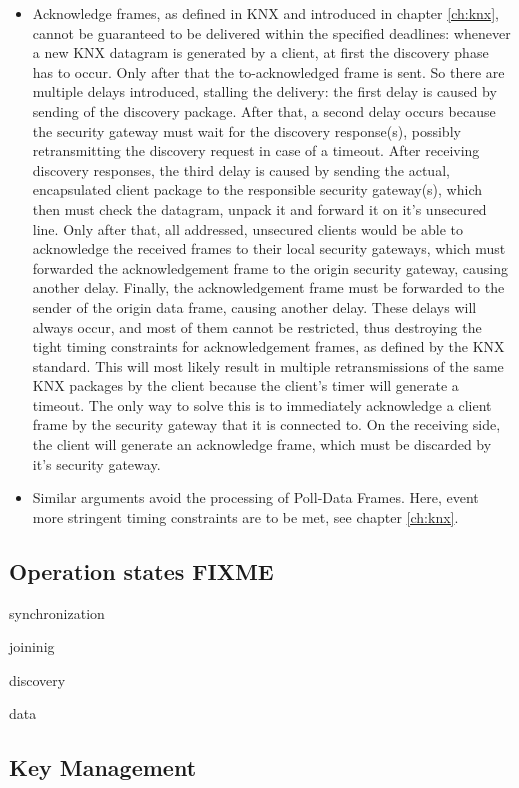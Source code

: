 \begin{itemize}
 \item Acknowledge frames, as defined in KNX and introduced in chapter \ref{ch:knx}, cannot be guaranteed to be delivered within the specified deadlines: whenever
 a new KNX datagram is generated by a client, at first the discovery phase has to occur. Only after that the to-acknowledged frame is sent. So there are
 multiple delays introduced, stalling the delivery: the first delay is caused by sending of the discovery package.
 After that, a second delay occurs because the security gateway must wait for the discovery response(s), possibly retransmitting the discovery request
 in case of a timeout. After receiving discovery responses, the third delay is caused by sending the actual, encapsulated
 client package to the responsible security gateway(s), which then must check the datagram, unpack it and forward it on it's unsecured line.
 Only after that, all addressed, unsecured clients would be able to acknowledge the received frames
 to their local security gateways,
 which must forwarded the acknowledgement frame to the origin security gateway, causing another delay. Finally, the acknowledgement frame must be forwarded to the sender of
 the origin data frame, causing another delay.
 These delays will always occur, and most of them cannot be restricted, thus destroying the tight timing constraints for acknowledgement frames, as defined
 by the KNX standard. This
 will most likely result in multiple retransmissions of the same KNX packages
 by the client because the client's timer will generate a timeout. The only way to solve this is to immediately acknowledge a client frame by the security
 gateway that it is connected to. On the receiving side, the client will generate an acknowledge
 frame, which must be discarded by it's security gateway.
 \item Similar arguments avoid the processing of Poll-Data Frames. Here, event more stringent timing constraints are to be met, see chapter \ref{ch:knx}. 
\end{itemize}

\subsection{Operation states FIXME}

synchronization

joininig

discovery

data

\subsection{Key Management}

